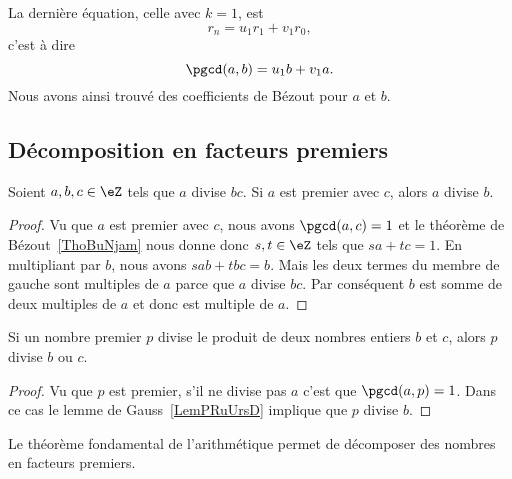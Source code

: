 La dernière équation, celle avec \( k=1\), est
\begin{equation}
    r_n=u_1r_1+v_1r_0,
\end{equation}
c'est à dire
\begin{equation}        \label{EqNDMLooDvaiAc}
    \pgcd(a,b)=u_1b+v_1a.
\end{equation}
Nous avons ainsi trouvé des coefficients de Bézout pour $a$ et $b$.

\subsection{Décomposition en facteurs premiers}

\begin{lemma}    \label{LemPRuUrsD}
    Soient \( a,b,c\in \eZ\) tels que \( a\) divise \( bc\). Si \( a\) est premier avec \( c\), alors \( a\) divise \( b\).
\end{lemma}

\begin{proof}
    Vu que \( a\) est premier avec \( c\), nous avons \( \pgcd(a,c)=1\) et le théorème de Bézout~\ref{ThoBuNjam} nous donne donc \( s,t\in \eZ\) tels que \( sa+tc=1\). En multipliant par \( b\), nous avons $sab+tbc=b$. Mais les deux termes du membre de gauche sont multiples de \( a\) parce que \( a\) divise \( bc\). Par conséquent \( b\) est somme de deux multiples de \( a\) et donc est multiple de \( a\).
\end{proof}

\begin{lemma}       \label{LemAXINooOeuMJZ}
    Si un nombre premier $p$ divise le produit de deux nombres entiers $b$ et $c$, alors $p$ divise $b$ ou $c$.
\end{lemma}

\begin{proof}
    Vu que \( p\) est premier, s'il ne divise pas \( a\) c'est que \( \pgcd(a,p)=1\). Dans ce cas le lemme de Gauss~\ref{LemPRuUrsD} implique que \( p\) divise \( b\).
\end{proof}

Le théorème fondamental de l'arithmétique permet de décomposer des nombres en facteurs premiers.

